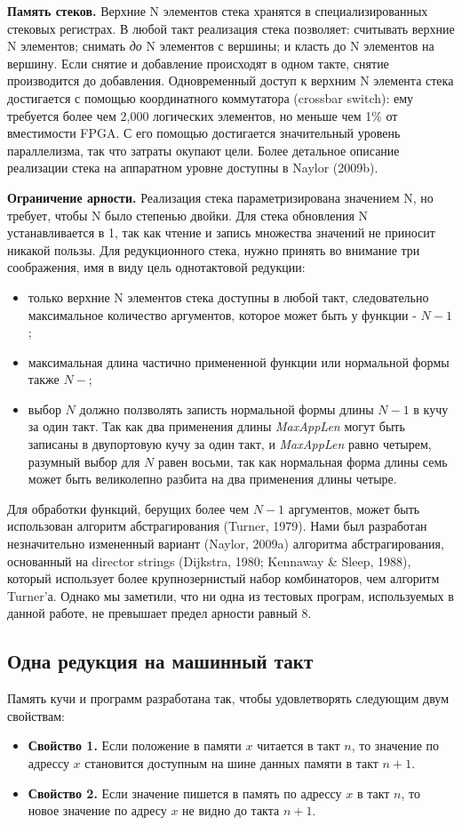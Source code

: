 \documentclass[flenqn, 14pt]{extarticle}
\begin{document}
\textbf{Память стеков.} Верхние N элементов стека хранятся в специализированных стековых регистрах. В любой такт реализация стека позволяет: считывать верхние N элементов; снимать \textit{до} N элементов с вершины; и класть до N элементов на вершину. Если снятие и добавление происходят в одном такте, снятие производится до добавления. Одновременный доступ к верхним N элемента стека достигается с помощью координатного коммутатора (crossbar switch): ему требуется более чем 2,000 логических элементов, но меньше чем 1\% от вместимости FPGA. С его помощью достигается значительный уровень параллелизма, так что затраты окупают цели. Более детальное описание реализации стека на аппаратном уровне доступны в Naylor (2009b). 

\textbf{Ограничение арности.} Реализация стека параметризирована значением N, но требует, чтобы N было степенью двойки. Для стека обновления N устанавливается в 1, так как чтение и запись множества значений не приносит никакой пользы. Для редукционного стека,  нужно принять во внимание три соображения, имя в виду цель однотактовой редукции:
\begin{itemize}
\item только верхние N элементов стека доступны в любой такт, следовательно максимальное количество аргументов, которое может быть у функции - $N-1$; 
\item максимальная длина частично примененной функции или нормальной формы также $N-$;
\item выбор $N$ должно ползволять записть нормальной формы длины $N-1$ в кучу за один такт.
Так как два применения длины \textit{MaxAppLen} могут быть записаны в двупортовую кучу за один такт, и \textit{MaxAppLen} равно четырем, разумный выбор для $N$ равен восьми, так как нормальная форма длины семь может быть великолепно разбита на два применения длины четыре.
\end{itemize}

Для обработки функций, берущих более чем $N-1$ аргументов, может быть использован алгоритм абстрагирования (Turner, 1979). Нами был разработан незначительно измененный вариант (Naylor, 2009a) алгоритма абстрагирования, основанный на director strings (Dijkstra, 1980; Kennaway \& Sleep, 1988), который использует более крупнозернистый набор комбинаторов, чем алгоритм Turner'а. Однако мы заметили, что ни одна из тестовых програм, используемых в данной работе, не превышает предел арности равный 8.

\subsection{Одна редукция на машинный такт}
Память кучи и программ разработана так, чтобы удовлетворять следующим двум свойствам:
\begin{itemize}
\item \textbf{Свойство 1.} Если положение в памяти $x$ читается в такт $n$, то значение по адрессу $x$ становится доступным на шине данных памяти в такт $n+1$.
\item \textbf{Свойство 2.} Если значение пишется в память по адрессу $x$ в такт $n$, то новое значение по адресу $x$ не видно до такта $n+1$. 
\end{itemize}
\end{document}
